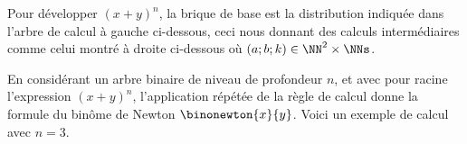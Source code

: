 Pour développer $(x + y)^n$, la brique de base est la distribution indiquée dans l'arbre de calcul à gauche ci-dessous, ceci nous donnant des calculs intermédiaires comme celui montré à droite ci-dessous où $(a;b;k) \in \NN^2 \times \NNs$.

%
            {\intertree}{}

En considérant un arbre binaire de niveau de profondeur $n$, et avec pour racine l'expression $(x + y)^n$, l'application répétée de la règle de calcul donne la formule du binôme de Newton
$\binonewton{x}{y}$.
%
Voici un exemple de calcul avec $n=3$.

